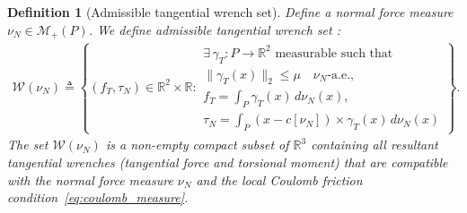 \documentclass[11pt,a4paper]{article}
\theoremstyle{proposition}
\newtheorem{definition}[theorem]{Definition}
\newcommand{\R}{\mathbb{R}}
\begin{document}
\begin{definition}[Admissible tangential wrench set]
    Define a normal force measure $\nu_N\in\mathcal M_+(P)$. We define \textit{admissible tangential wrench set} :
    \begin{align}
    \mathcal W(\nu_N)
    \triangleq
    \left\{
    (f_T,\tau_N)\in\mathbb R^2\times\mathbb R:
    \begin{array}{l}
    \exists\,\gamma_T:P\rightarrow\mathbb R^2
    \text{ measurable such that}\\
    \|\gamma_T(x)\|_2\le\mu
    \quad\nu_N\text{-a.e.},\\
    f_T=\displaystyle\int_P\gamma_T(x)\,d\nu_N(x),\\
    \tau_N=\displaystyle\int_P
    (x-c[\nu_N])\times\gamma_T(x)\,d\nu_N(x)
    \end{array}
    \right\}.
    \end{align}
    The set $\mathcal W(\nu_N)$ is a non-empty compact subset of $\R^3$ containing all resultant tangential wrenches (tangential force and torsional moment) that are compatible with the normal force measure $\nu_N$ and the local Coulomb friction condition~\eqref{eq:coulomb_measure}.
\end{definition}
\end{document}

